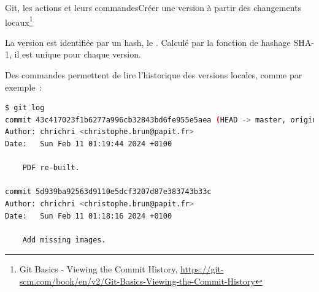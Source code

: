 \documentclass{beamer}
\begin{document}
    \begin{frame}[fragile]{Git, les actions et leurs commandes}{Créer une version à partir des changements locaux\footnote{Git Basics - Viewing the Commit History, \url{https://git-scm.com/book/en/v2/Git-Basics-Viewing-the-Commit-History}}}
        \transdissolve

        La version est identifiée par un hash, le .
        Calculé par la fonction de hashage SHA-1, il est unique pour chaque version.

        Des commandes permettent de lire l'historique des versions locales, comme par exemple~:
        \begin{lstlisting}[language=sh]
$ git log
commit 43c417023f1b6277a996cb32843bd6fe955e5aea (HEAD -> master, origin/master)
Author: chrichri <christophe.brun@papit.fr>
Date:   Sun Feb 11 01:19:44 2024 +0100

    PDF re-built.

commit 5d939ba92563d9110e5dcf3207d87e383743b33c
Author: chrichri <christophe.brun@papit.fr>
Date:   Sun Feb 11 01:18:16 2024 +0100

    Add missing images.
        \end{lstlisting}
    \end{frame}
\end{document}
